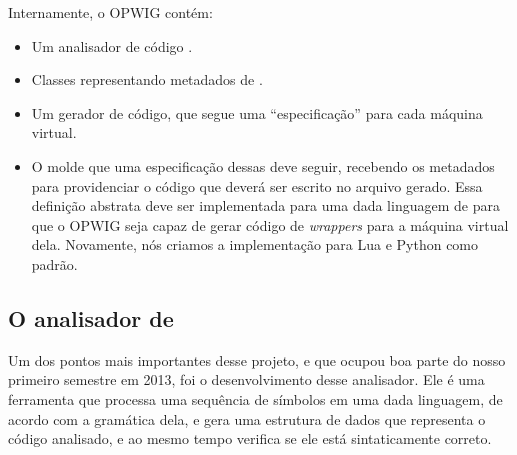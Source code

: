   Internamente, o OPWIG contém:
  \begin{itemize}
    \item Um analisador de código \CXX{}.
    \item Classes representando metadados de \CXX{}.
    \item Um gerador de código, que segue uma ``especificação'' para cada máquina virtual.
    \item O molde que uma especificação dessas deve seguir, recebendo
      os metadados para providenciar o código que deverá ser escrito no arquivo gerado. Essa
      definição abstrata deve ser implementada para uma dada linguagem de \script{} para
      que o OPWIG seja capaz de gerar código de \textit{wrappers} para a máquina virtual dela.
      Novamente, nós criamos a implementação para Lua e Python como padrão.
  \end{itemize}
  
  \subsection{O analisador de \CXX{}}
  Um dos pontos mais importantes desse projeto, e que ocupou boa parte do nosso primeiro semestre em 2013,
  foi o desenvolvimento desse analisador. Ele é uma ferramenta que processa uma sequência de símbolos
  em uma dada linguagem, de acordo com a gramática dela, e gera uma estrutura de dados que representa o
  código analisado, e ao mesmo tempo verifica se ele está sintaticamente correto.
  
